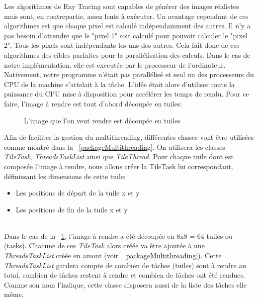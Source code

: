\documentclass[11pt]{article}
\begin{document}
Les algorithmes de Ray Tracing sont capables de générer des images réalistes mais sont, en contrepartie, assez lents à exécuter. Un avantage cependant de ces algorithmes est que chaque pixel est calculé indépendamment des autres. Il n'y a pas besoin d'attendre que le "pixel 1" soit calculé pour pouvoir calculer le "pixel 2". Tous les pixels sont indépendants les uns des autres. Cela fait donc de ces algorithmes des cibles parfaites pour la parallélisation des calculs. Dans le cas de notre implémentation, elle est executée par le processeur de l'ordinateur. Nativement, notre programme n'était pas parallélisé et seul un des processeurs du CPU de la machine s'attelait à la tâche. L'idée était alors d'utiliser toute la puissance du CPU mise à disposition pour accélérer les temps de rendu. Pour ce faire, l'image à rendre est tout d'abord découpée en tuiles:

\begin{figure}[h!]

	\caption{L'image que l'on veut rendre est découpée en tuiles}
	\label{grilleMultithreading}
\end{figure}
\FloatBarrier

Afin de faciliter la gestion du multithreading, différentes classes vont être utilisées comme montré dans la \figurename\ \ref{packageMultithreading}. On utilisera les classes \textit{TileTask}, \textit{ThreadsTaskList} ainsi que \textit{TileThread}. Pour chaque tuile dont est composée l'image à rendre, nous allons créer la TileTask lui correspondant, définissant les dimensions de cette tuile:
\begin{itemize}
	\item {Les positions de départ de la tuile x et y}
	\item {Les positions de fin de la tuile x et y}
\end{itemize}
\hfill\\
Dans le cas de la \figurename\ \ref{grilleMultithreading}, l'image à rendre a été découpée en 8x8 = 64 tuiles ou (tasks). Chacune de ces \textit{TileTask} alors créée va être ajoutée à une \textit{ThreadsTaskList} créée en amont (voir \figurename\ \ref{packageMultithreading}). Cette \textit{ThreadsTaskList} gardera compte de combien de tâches (tuiles) sont à rendre au total, combien de tâches restent à rendre et combien de tâches ont été rendues. Comme son nom l'indique, cette classe disposera aussi de la liste des tâches elle même.
\end{document}

